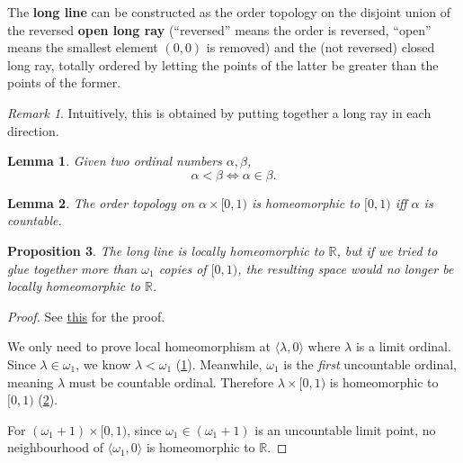 \documentclass[12pt, letterpaper]{article}
\newcommand{\re}{\mathbb{R}}
\newtheorem{prop}{Proposition}[section]
\newtheorem{lem}[prop]{Lemma}
\theoremstyle{definition}
\theoremstyle{remark}
\newtheorem*{rem*}{Remark}
\theoremstyle{definition}
\theoremstyle{plain}
\numberwithin{equation}{section}
\begin{document}
	\begin{def*}
		The \textbf{long line} can be constructed as the order topology on the disjoint union of the reversed \textbf{open long ray}
		(``reversed'' means the order is reversed, ``open'' means the smallest element $(0,0)$ is removed)
		and the (not reversed) closed long ray, totally ordered by letting the points of the latter be greater than the points of the former.
	\end{def*}
	\begin{rem*}
		Intuitively, this is obtained by putting together a long ray in each direction.
	\end{rem*}

	\begin{lem}\label{lem_smaller_iff_in}
		Given two ordinal numbers $\alpha, \beta$,
		\[\alpha<\beta\iff\alpha\in\beta.\]
	\end{lem}
	\begin{lem}\label{lem_countable_homeomorphic}
		The order topology on $\alpha\times[0,1)$ is homeomorphic to $[0,1)$
		iff $\alpha$ is countable.
	\end{lem}
	\begin{prop}
		The long line is locally homeomorphic to $\re$, but 
		if we tried to glue together more than $\omega _{1}$ copies of $[0,1)$,
		the resulting space would no longer be locally homeomorphic to $\re$.
	\end{prop}
	\begin{proof}
		See \href{https://math.stackexchange.com/questions/700178/long-ray-proof-of-being-locally-euclidean}
		{this} for the proof.
		
		We only need to prove local homeomorphism at $\langle\lambda,0\rangle$ where $\lambda$ is a limit ordinal.
		Since $\lambda\in\omega_{1}$, we know $\lambda<\omega_{1}$ (\ref{lem_smaller_iff_in}).
		Meanwhile, $\omega_{1}$ is the \textit{first} uncountable ordinal,
		meaning $\lambda$ must be countable ordinal.
		Therefore $\lambda\times[0,1)$ is homeomorphic to $[0,1)$ (\ref{lem_countable_homeomorphic}).
		
		For $(\omega_{1}+1)\times[0,1)$, since $\omega_{1}\in(\omega_{1}+1)$ is an uncountable limit point,
		no neighbourhood of $\langle\omega_1,0\rangle$ is homeomorphic to $\re$.
	\end{proof}
\end{document}
